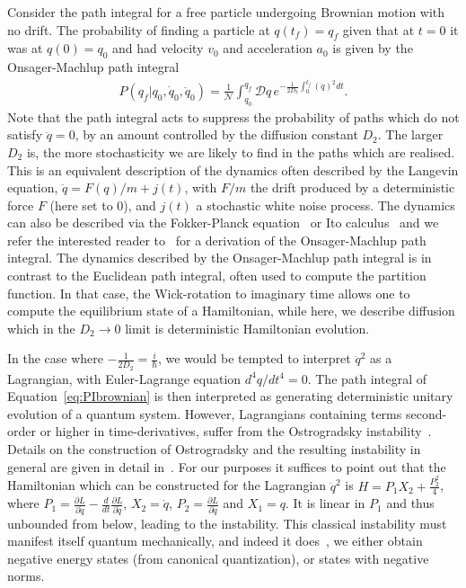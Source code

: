 \documentclass[aps,preprintnumbers,superscriptaddress,longbibliography]{revtex4-1}
\begin{document}
Consider the path integral for a free particle undergoing Brownian motion with no drift. The probability of finding a particle at $q(t_f)=q_f$ given that at $t=0$ it was at $q(0)=q_0$ and had velocity $v_0$ and acceleration $a_0$ is given by the Onsager-Machlup path integral
\begin{align}
    P(q_f|q_0,\dot{q}_0,\ddot{q}_0)=\frac{1}{\mathcal{N}}\int_{q_0}^{q_f} \mathcal{D}q\, e^{-\frac{1}{2 D_2}\int_{0}^{t_f} (\ddot{q})^2 dt}.
    \label{eq:PIbrownian}
\end{align}
Note that the path integral acts to suppress the probability of paths which do not satisfy $\ddot{q}=0$, by an amount controlled by the diffusion constant $D_2$. The larger $D_2$ is, the more stochasticity we are likely to find in the paths which are realised.
This is an equivalent description of the dynamics often described by the Langevin equation, $\ddot{q}=F(q)/m+j(t)$, with $F/m$ the drift produced by a deterministic force $F$ (here set to $0$), and $j(t)$ a stochastic white noise process. The dynamics can also be described via the Fokker-Planck equation~\cite{risken1996fokker}  or Ito calculus~\cite{gardiner2004handbook} and we refer the interested reader to~\cite{risken1996fokker} for a derivation of the Onsager-Machlup path integral. The dynamics described by the Onsager-Machlup path integral is in contrast to the Euclidean path integral, often used to compute the partition function. In that case, the Wick-rotation to imaginary time allows one to compute the equilibrium state of a Hamiltonian, while here, we describe diffusion which in the $D_2\rightarrow 0$ limit is deterministic Hamiltonian evolution.

In the case where $-\frac{1}{2D_2}=\frac{i}{\hbar}$, we would be tempted to interpret $\ddot{q}^2$ as a Lagrangian, with Euler-Lagrange equation $d^4 q/dt^4=0$. The path integral of Equation~\eqref{eq:PIbrownian} is then interpreted as generating deterministic unitary evolution of a quantum system. However, 
Lagrangians containing terms second-order or higher in time-derivatives, suffer from the Ostrogradsky instability~\cite{ostrogradsky1850memoire}. Details on the construction of Ostrogradsky and the resulting instability in general are given in detail in~\cite{woodard2015theorem}. For our purposes it suffices to point out that the Hamiltonian which can be constructed for the Lagrangian $\ddot{q}^2$ is $H= P_1X_2+\frac{P_2^2}{4}$, where $P_1=\frac{\partial L}{\partial \dot{q}}-\frac{d}{dt}\frac{\partial L}{\partial \ddot{q}}$, $X_2=\dot{q}$, $P_2=\frac{\partial L}{\partial \ddot{q}}$ and  $X_1=q$. It is linear in $P_1$ and thus unbounded from below, leading to the instability.  %
This classical instability must manifest itself quantum mechanically, and indeed it does~\cite{stelle1977renormalization,woodard2015theorem,ganz2021reconsidering}, we either obtain negative energy states (from canonical quantization), or states with negative norms.  
\end{document}

